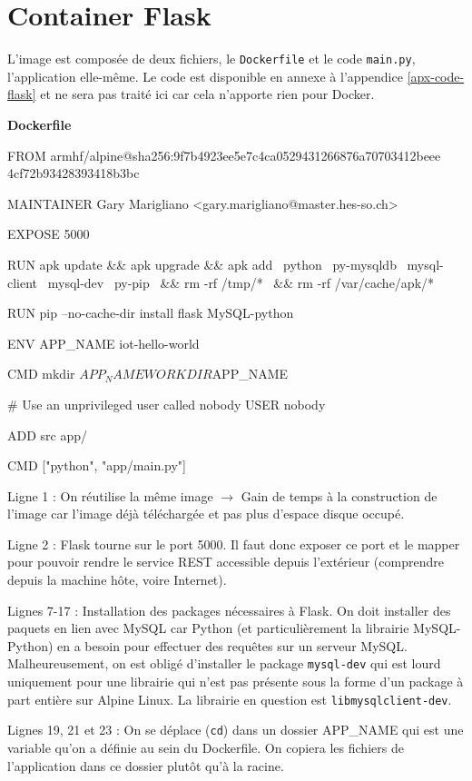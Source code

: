 \documentclass[11pt,a4paper,oneside]{report}
\newcommand{\code}[1]{\texttt{#1}}
\begin{document}
\section{Container Flask}
L'image est composée de deux fichiers, le \code{Dockerfile} et le code \code{main.py}, l'application elle-même. Le code est disponible en annexe à l'appendice \ref{apx-code-flask} et ne sera pas traité ici car cela n'apporte rien pour Docker.

\textbf{Dockerfile}
\begin{bashcode}
FROM armhf/alpine@sha256:9f7b4923ee5e7c4ca0529431266876a70703412beee
4cf72b93428393418b3bc

MAINTAINER Gary Marigliano <gary.marigliano@master.hes-so.ch>

EXPOSE 5000

RUN apk update && apk upgrade && apk add \
  python \
  py-mysqldb \
  mysql-client \
  mysql-dev \
  py-pip \
  && rm -rf /tmp/* \
  && rm -rf /var/cache/apk/*

RUN pip --no-cache-dir install flask MySQL-python

ENV APP_NAME iot-hello-world

CMD mkdir ${APP_NAME}

WORKDIR ${APP_NAME}

# Use an unprivileged user called nobody
USER nobody

ADD src app/

CMD ["python", "app/main.py"]
\end{bashcode}

Ligne 1 : On réutilise la même image $ \to $ Gain de temps à la construction de l'image car l'image déjà téléchargée et pas plus d'espace disque occupé.

Ligne 2 : Flask tourne sur le port 5000. Il faut donc exposer ce port et le mapper pour pouvoir rendre le service REST accessible depuis l'extérieur (comprendre depuis la machine hôte, voire Internet).

Lignes 7-17 : Installation des packages nécessaires à Flask. On doit installer des paquets en lien avec MySQL car Python (et particulièrement la librairie MySQL-Python) en a besoin pour effectuer des requêtes sur un serveur MySQL. Malheureusement, on est obligé d'installer le package \code{mysql-dev} qui est lourd uniquement pour une librairie qui n'est pas présente sous la forme d'un package à part entière sur Alpine Linux. La librairie en question est  \code{libmysqlclient-dev}\cite{bug_mysql_alpine}.

Lignes 19, 21 et 23 : On se déplace (\code{cd}) dans un dossier APP\_NAME qui est une variable qu'on a définie au sein du Dockerfile. On copiera les fichiers de l'application dans ce dossier plutôt qu'à la racine.
\end{document}
